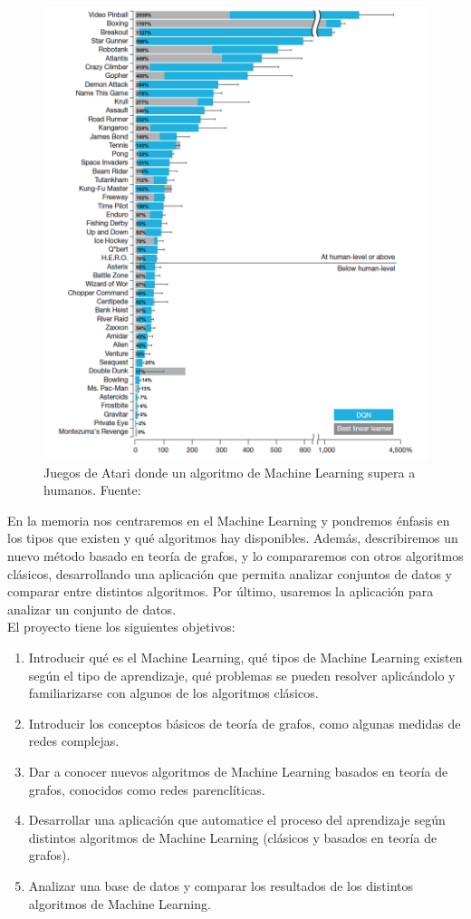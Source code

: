 \begin{figure}[tbph!]
\centering
\includegraphics[width=0.7\linewidth]{imagenes/atari.png}
\caption[Juegos de Atari donde un algoritmo de Machine Learning supera a humanos.]{Juegos de Atari donde un algoritmo de Machine Learning supera a humanos. Fuente:~\cite{mnih-dqn-2015}}

\label{fig:atari}
\end{figure}

En la memoria nos centraremos en el Machine Learning y pondremos énfasis en los tipos que existen y qué algoritmos hay disponibles. Además, describiremos un nuevo método basado en teoría de grafos, y lo compararemos con otros algoritmos clásicos, desarrollando una aplicación que permita analizar conjuntos de datos y comparar entre distintos algoritmos. Por último, usaremos la aplicación para analizar un conjunto de datos.\\

El proyecto tiene los siguientes objetivos:

\begin{enumerate}
\item Introducir qué es el Machine Learning, qué tipos de Machine Learning existen según el tipo de aprendizaje, qué problemas se pueden resolver aplicándolo y familiarizarse con algunos de los algoritmos clásicos.

\item Introducir los conceptos básicos de teoría de grafos, como algunas medidas de redes complejas.

\item Dar a conocer nuevos algoritmos de Machine Learning basados en teoría de grafos, conocidos como redes parenclíticas.

\item Desarrollar una aplicación que automatice el proceso del aprendizaje según distintos algoritmos de Machine Learning (clásicos y basados en teoría de grafos).

\item Analizar una base de datos y comparar los resultados de los distintos algoritmos de Machine Learning.
\end{enumerate}

